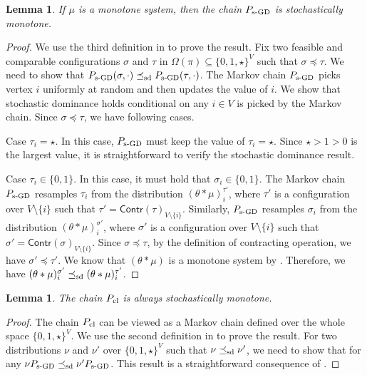 \documentclass[11pt,a4paper]{article}
\newcommand{\sd}{\preceq_{\textnormal{sd}}}
\newcommand{\psim}{P_{\textnormal{s-GD}}}
\newtheorem{lemma}[theorem]{Lemma}
\theoremstyle{definition}
\begin{document}
\begin{lemma}\label{lem:monotone-sgd}
If $\mu$ is a monotone system, then the chain $\psim$ is stochastically monotone.
\end{lemma}
\begin{proof}
We use the third definition in  to prove the result. Fix two feasible and comparable configurations $\sigma$ and $\tau$ in $\Omega(\pi) \subseteq \{0,1,\star\}^V$ such that $\sigma\preceq \tau$. We need to show that $\psim(\sigma,\cdot) \sd \psim(\tau,\cdot)$. The Markov chain $\psim$ picks vertex $i$ uniformly at random and then updates the value of $i$. We show that stochastic dominance holds conditional on any $i \in V$ is picked by the Markov chain. 
Since $\sigma\preceq \tau$, we have following cases.

Case $\tau_i = \star$. In this case, $\psim$ must keep the value of $\tau_i = \star$. Since $\star > 1 > 0$ is the largest value, it is straightforward to verify the stochastic dominance result.
 
Case $\tau_i \in \{0,1\}$. In this case, it must hold that $\sigma_i \in \{0,1\}$. The Markov chain $\psim$ resamples $\tau_i$ from the distribution $(\theta * \mu)^{\tau'}_i$, where $\tau'$ is a configuration over $V \setminus \{i\}$ such that $\tau' = \textsf{Contr}(\tau)_{V \setminus \{i\}}$. Similarly, $\psim$ resamples $\sigma_i$ from the distribution $(\theta * \mu)^{\sigma'}_i$, where $\sigma'$ is a configuration over $V \setminus \{i\}$ such that $\sigma' = \textsf{Contr}(\sigma)_{V \setminus \{i\}}$. Since $\sigma \preceq \tau$, by the definition of contracting operation, we have $\sigma' \preceq \tau'$. We know that $(\theta * \mu)$ is a monotone system by . Therefore, we have $(\theta * \mu)^{\sigma'}_i \sd(\theta * \mu)^{\tau'}_i$.
\end{proof}

\begin{lemma}\label{lem:monotone-pcl}
The chain $P_{\textnormal{cl}}$ is always stochastically monotone.
\end{lemma}
\begin{proof}
The chain $P_{\textnormal{cl}}$ can be viewed as a Markov chain defined over the whole space $\{0,1,\star\}^V$. We use the second definition in  to prove the result. For two distributions $\nu$ and $\nu'$ over $\{0,1,\star\}^V$ such that $\nu \sd \nu'$, we need to show that for any $\nu \psim \sd \nu' \psim$. This result is a straightforward consequence of .
\end{proof}
\end{document}
